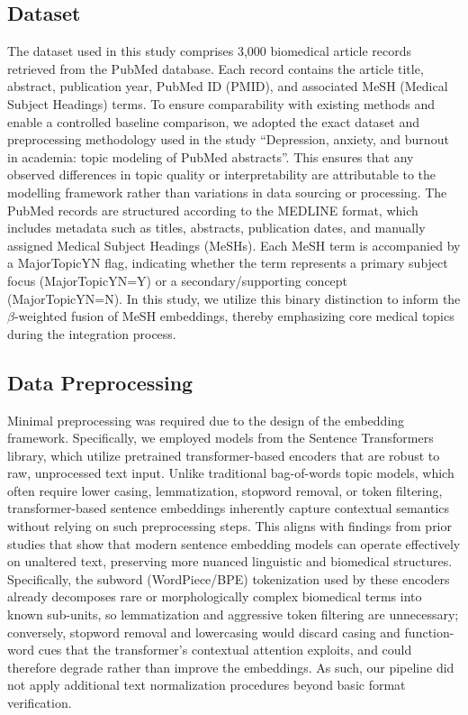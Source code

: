\documentclass[authorproof,JACIII,researchpaper]{fujipressarticle}
\begin{document}
\subsection{Dataset}
The dataset used in this study comprises 3,000 biomedical article records retrieved from the PubMed database. Each record contains the article title, abstract, publication year, PubMed ID (PMID), and associated MeSH (Medical Subject Headings) terms. {\color{red}To ensure comparability with existing methods and enable a controlled baseline comparison, we adopted the exact dataset and preprocessing methodology used in the study ``Depression, anxiety, and burnout in academia: topic modeling of PubMed abstracts''\cite{lezhnina_depression_2023}.} This ensures that any observed differences in topic quality or interpretability are attributable to the modelling framework rather than variations in data sourcing or processing.
The PubMed records are structured according to the MEDLINE format, which includes metadata such as titles, abstracts, publication dates, and manually assigned Medical Subject Headings (MeSHs). Each MeSH term is accompanied by a MajorTopicYN flag, indicating whether the term represents a primary subject focus (MajorTopicYN=Y) or a secondary/supporting concept (MajorTopicYN=N). In this study, we utilize this binary distinction to inform the $\beta$-weighted fusion of MeSH embeddings, thereby emphasizing core medical topics during the integration process.

\subsection{Data Preprocessing}
Minimal preprocessing was required due to the design of the embedding framework. Specifically, we employed models from the Sentence Transformers library, which utilize pretrained transformer-based encoders that are robust to raw, unprocessed text input\cite{reimers_sentence-bert_2019}. Unlike traditional bag-of-words topic models, which often require lower casing, lemmatization, stopword removal, or token filtering, transformer-based sentence embeddings inherently capture contextual semantics without relying on such preprocessing steps. This aligns with findings from prior studies that show that modern sentence embedding models can operate effectively on unaltered text, preserving more nuanced linguistic and biomedical structures\cite{wang_graph-embedded_2022}. {\color{red}Specifically, the subword (WordPiece/BPE) tokenization used by these encoders already decomposes rare or morphologically complex biomedical terms into known sub-units, so lemmatization and aggressive token filtering are unnecessary; conversely, stopword removal and lowercasing would discard casing and function-word cues that the transformer's contextual attention exploits, and could therefore degrade rather than improve the embeddings.} As such, our pipeline did not apply additional text normalization procedures beyond basic format verification.
\end{document}
